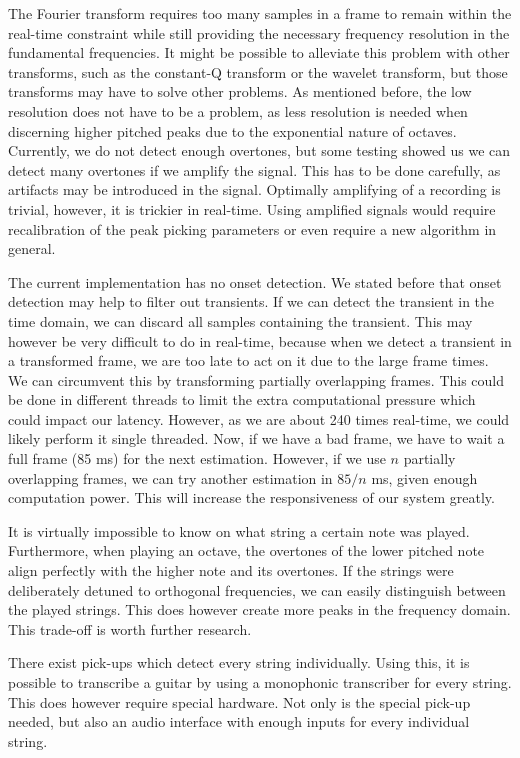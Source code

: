 \documentclass[10pt,twocolumn]{article}
\begin{document}
The Fourier transform requires too many samples in a frame to remain within the real-time constraint while still providing the necessary frequency resolution in the fundamental frequencies. It might be possible to alleviate this problem with other transforms, such as the constant-Q transform or the wavelet transform, but those transforms may have to solve other problems. As mentioned before, the low resolution does not have to be a problem, as less resolution is needed when discerning higher pitched peaks due to the exponential nature of octaves. Currently, we do not detect enough overtones, but some testing showed us we can detect many overtones if we amplify the signal. This has to be done carefully, as artifacts may be introduced in the signal. Optimally amplifying of a recording is trivial, however, it is trickier in real-time. Using amplified signals would require recalibration of the peak picking parameters or even require a new algorithm in general.

The current implementation has no onset detection. We stated before that onset detection may help to filter out transients. If we can detect the transient in the time domain, we can discard all samples containing the transient. This may however be very difficult to do in real-time, because when we detect a transient in a transformed frame, we are too late to act on it due to the large frame times. We can circumvent this by transforming partially overlapping frames. This could be done in different threads to limit the extra computational pressure which could impact our latency. However, as we are about 240 times real-time, we could likely perform it single threaded. Now, if we have a bad frame, we have to wait a full frame (85 ms) for the next estimation. However, if we use $n$ partially overlapping frames, we can try another estimation in $85/n$ ms, given enough computation power. This will increase the responsiveness of our system greatly.

It is virtually impossible to know on what string a certain note was played. Furthermore, when playing an octave, the overtones of the lower pitched note align perfectly with the higher note and its overtones. If the strings were deliberately detuned to orthogonal frequencies, we can easily distinguish between the played strings. This does however create more peaks in the frequency domain. This trade-off is worth further research.

There exist pick-ups which detect every string individually. Using this, it is possible to transcribe a guitar by using a monophonic transcriber for every string. This does however require special hardware. Not only is the special pick-up needed, but also an audio interface with enough inputs for every individual string.





\end{document}
